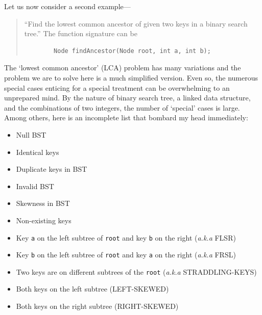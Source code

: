 \documentclass[oneside,11pt]{book}
\theoremstyle{definition}
\theoremstyle{remark}
\newcommand{\code}[1]{\mbox{\lstinline{#1}}}
\begin{document}
Let us now consider a second example---
\begin{quote}
    ``Find the lowest common ancestor of given two keys in a binary search tree.''
    The function signature can be
    \begin{lstlisting}
        Node findAncestor(Node root, int a, int b);
    \end{lstlisting}
\end{quote}

The `lowest common ancestor' (LCA) problem has many variations and the problem we are to solve
here is a much simplified version.
Even so, the numerous special cases enticing for a special treatment can be
overwhelming to an unprepared mind.
By the nature of binary search tree, a linked data structure, and the combinations of two integers,
the number of `special' cases is large.
Among others, here is an incomplete list that bombard my head immediately:
\begin{itemize}
    \item Null BST
    \item Identical keys
    \item Duplicate keys in BST
    \item Invalid BST
    \item Skewness in BST
    \item Non-existing keys
    \item Key \code{a} on the left subtree of \code{root} and key \code{b} on the right
    (\textit{a.k.a} FLSR)
    \item Key \code{b} on the left subtree of \code{root} and key \code{a} on the right
    (\textit{a.k.a} FRSL)
    \item Two keys are on different subtrees of the \code{root} (\textit{a.k.a} STRADDLING-KEYS)
    \item Both keys on the left subtree (LEFT-SKEWED)
    \item Both keys on the right subtree (RIGHT-SKEWED)
\end{itemize}
\end{document}
